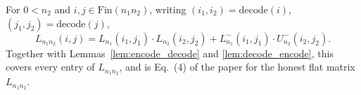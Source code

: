 \begin{theorem}
  \label{thm:theorem1_flat'}
  \leanok
  For $0 < n_2$ and $i, j \in \mathrm{Fin}(n_1 n_2)$, writing
  $(i_1,i_2) = \mathrm{decode}(i)$, $(j_1,j_2) = \mathrm{decode}(j)$,
  \[
    L_{n_1 n_2}(i,j)
      = L_{n_1}(i_1,j_1) \cdot L_{n_2}(i_2,j_2)
        + L^-_{n_1}(i_1,j_1) \cdot U^-_{n_2}(i_2,j_2).
  \]
  Together with Lemmas~\ref{lem:encode_decode} and
  \ref{lem:decode_encode}, this covers every entry of $L_{n_1 n_2}$, and
  is Eq.~(4) of the paper for the honest flat matrix $L_{n_1 n_2}$.
\end{theorem}

